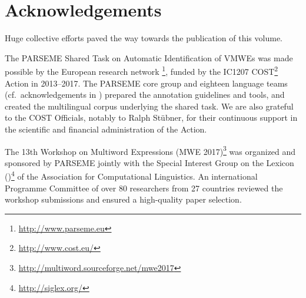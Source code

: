 \documentclass[output=paper,modfonts,]{langscibook}
\begin{document}





\section{Acknowledgements}
Huge collective efforts paved the way towards the publication of this volume. 

The  PARSEME Shared Task on Automatic Identification of VMWEs was made possible by the European research network \footnote{\url{http://www.parseme.eu}}, funded by the IC1207 COST\footnote{\url{http://www.cost.eu/}} Action in 2013--2017. The PARSEME core group and eighteen language teams (cf.~acknowledgements in ) prepared the annotation guidelines and tools, and created the multilingual corpus underlying the shared task. We are also grateful to the COST Officials, notably to Ralph Stübner, for their %
continuous support in the scientific and financial administration of the Action. 

The 13th Workshop on Multiword Expressions (MWE 2017)\footnote{\url{http://multiword.sourceforge.net/mwe2017}}  was organized and sponsored by PARSEME jointly with the Special Interest Group on the Lexicon ()\footnote{\url{http://siglex.org/}} of the Association for Computational Linguistics. An international Programme Committee of over 80 researchers from 27 countries reviewed the workshop submissions and ensured a high-quality paper selection.
\end{document}
